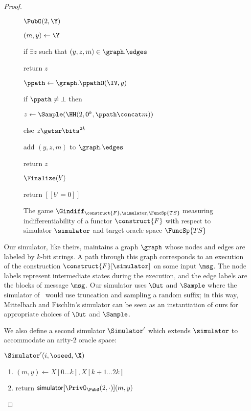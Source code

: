 \begin{proof}
\begin{figure}
{		}
		{	\ExptSepSpace
			\begin{algorithm}{$\PubO(2,\Y)$}
				\item $(m, y) \gets \Y$
				\item if $\exists z$ such that $(y, z, m) \in \graph.\edges$
				\item \quad return $z$
				\item $\ppath \gets \graph.\ppathO(\IV, y)$
				\item if $\ppath \neq \bot$ then 
				\item \quad $z \gets \Sample(\HH(2, 0^k, \ppath\concat m))$
				\item else $z \getsr \bits^{2k}$
				\item add $(y, z, m)$ to $\graph.\edges$
				\item return $z$
			\end{algorithm}
			\ExptSepSpace
			\begin{algorithm}{$\Finalize(b')$}
				\item return $[[b' = 0]]$
			\end{algorithm}
		}
		\vspace{5pt}
		\caption{The game  $\Gindiff_{\construct{F}, \simulator, \FuncSp{TS}}$ measuring indifferentiability of a functor $\construct{F}$ with respect to simulator $\simulator$ and target oracle space $\FuncSp{TS}$}
		\label{fig-lemma-gm0}
	\end{figure}
	
	Our simulator, like theirs, maintains a graph $\graph$ whose nodes and edges are labeled by $k$-bit strings. A path through this graph corresponds to an execution of the construction $\construct{F}[\simulator]$ on some input $\msg$. The node labels represent intermediate states during the execution, and the edge labels are the blocks of message $\msg$. Our simulator uses $\Out$ and $\Sample$ where the simulator of~\cite{hfrobook} would use truncation and sampling a random suffix; in this way, Mittelbach and Fischlin's simulator can be seen as an instantiation of ours for appropriate choices of $\Out$ and $\Sample$. 

	We also define a second simulator $\Simulator'$ which extends $\simulator$ to accommodate an arity-$2$ oracle space:		 
	
	\underline{$\Simulator'(i, \oseed, \X)$}
	\begin{enumerate}
		\item $(m, y) \gets X[0\ldots k], X[k+1\ldots 2k]$
		\item return $\mathsf{simulator}[\PrivO_{\PubS}(2,\cdot)](m,y)$
	\end{enumerate}


\end{proof}
